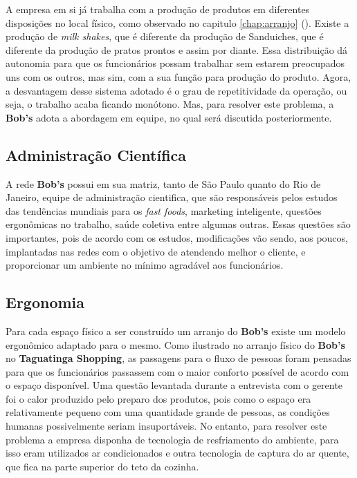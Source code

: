 			A empresa em si já trabalha com a produção de produtos em diferentes disposições no local físico, como observado no capitulo \ref{chap:arranjo} (). Existe a produção de \emph{milk shakes}, que é diferente da produção de Sanduiches, que é diferente da produção de pratos prontos e assim por diante. Essa distribuição dá autonomia para que os funcionários possam trabalhar sem estarem preocupados uns com os outros, mas sim, com a sua função para produção do produto. Agora, a desvantagem desse sistema adotado é o grau de repetitividade da operação, ou seja, o trabalho acaba ficando monótono. Mas, para resolver este problema, a \textbf{Bob’s} adota a abordagem em equipe, no qual será discutida posteriormente.

		\subsection[Administração Científica]{Administração Científica}
		\label{sec:organizacao_ac}

			A rede \textbf{Bob’s} possui em sua matriz, tanto de São Paulo quanto do Rio de Janeiro, equipe de administração cientifica, que são responsáveis pelos estudos das tendências mundiais para os \emph{fast foods}, marketing inteligente, questões ergonômicas no trabalho, saúde coletiva entre algumas outras. Essas questões são importantes, pois de acordo com os estudos, modificações vão sendo, aos poucos, implantadas nas redes com o objetivo de atendendo melhor o cliente, e proporcionar um ambiente no mínimo agradável aos funcionários. \cite{osman}

		\subsection[Ergonomia]{Ergonomia}
		\label{sec:organizacao_ergonomia}

			Para cada espaço físico a ser construído um arranjo do \textbf{Bob’s} existe um modelo ergonômico adaptado para o mesmo. Como ilustrado no arranjo físico do \textbf{Bob’s} no \textbf{Taguatinga Shopping}, as passagens para o fluxo de pessoas foram pensadas para que os funcionários passassem com o maior conforto possível de acordo com o espaço disponível. Uma questão levantada durante a entrevista com o gerente foi o calor produzido pelo preparo dos produtos, pois como o espaço era relativamente pequeno com uma quantidade grande de pessoas, as condições humanas possivelmente seriam insuportáveis. No entanto, para resolver este problema a empresa disponha de tecnologia de resfriamento do ambiente, para isso eram utilizados ar condicionados e outra tecnologia de captura do ar quente, que fica na parte superior do teto da cozinha.

